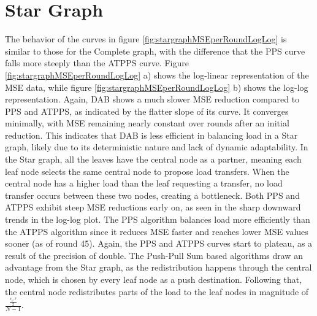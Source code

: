 \section{Star Graph}\label{sec:stargraph}
The behavior of the curves in figure \ref{fig:stargraphMSEperRoundLogLog} is similar to those for the Complete graph, with the difference that the PPS curve falls more steeply than the ATPPS curve. Figure \ref{fig:stargraphMSEperRoundLogLog} a) shows the log-linear representation of the MSE data, while figure \ref{fig:stargraphMSEperRoundLogLog} b) shows the log-log representation. Again, DAB shows a much slower MSE reduction compared to PPS and ATPPS, as indicated by the flatter slope of its curve. It converges minimally, with MSE remaining nearly constant over rounds after an initial reduction. This indicates that DAB is less efficient in balancing load in a Star graph, likely due to its deterministic nature and lack of dynamic adaptability. In the Star graph, all the leaves have the central node as a partner, meaning each leaf node selects the same central node to propose load transfers. When the central node has a higher load than the leaf requesting a transfer, no load transfer occurs between these two nodes, creating a bottleneck. Both PPS and ATPPS exhibit steep MSE reductions early on, as seen in the sharp downward trends in the log-log plot. The PPS algorithm balances load more efficiently than the ATPPS algorithm since it reduces MSE faster and reaches lower MSE values sooner (as of round 45). Again, the PPS and ATPPS curves start to plateau, as a result of the precision of double. The Push-Pull Sum based algorithms draw an advantage from the Star graph, as the redistribution happens through the central node, which is chosen by every leaf node as a push destination. Following that, the central node redistributes parts of the load to the leaf nodes in magnitude of $\frac{\frac{s_i,r}{2}}{N-1}$.

